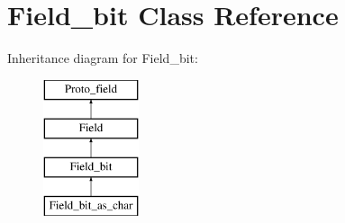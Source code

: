 \hypertarget{classField__bit}{}\section{Field\+\_\+bit Class Reference}
\label{classField__bit}
Inheritance diagram for Field\+\_\+bit\+:\begin{figure}[H]
\begin{center}
\leavevmode
\includegraphics[height=4.000000cm]{classField__bit}
\end{center}
\end{figure}
